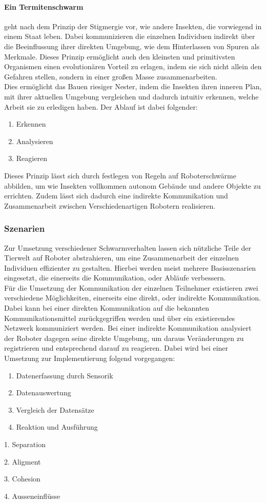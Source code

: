 \paragraph{Ein Termitenschwarm} geht nach dem Prinzip der Stigmergie vor, wie andere Insekten, die vorwiegend in einem Staat leben. Dabei kommunizieren die einzelnen Individuen indirekt über die Beeinflussung ihrer direkten Umgebung, wie dem Hinterlassen von Spuren als Merkmale. Dieses Prinzip ermöglicht auch den kleinsten und primitivsten Organismen einen evolutionären Vorteil zu erlagen, indem sie sich nicht allein den Gefahren stellen, sondern in einer großen Masse zusammenarbeiten.\\
Dies ermöglicht das Bauen riesiger Nester, indem die Insekten ihren inneren Plan, mit ihrer aktuellen Umgebung vergleichen und dadurch intuitiv erkennen, welche Arbeit sie zu erledigen haben.%
	Der Ablauf ist dabei folgender:
\begin{enumerate}
	\item Erkennen
	\item Analysieren
	\item Reagieren
\end{enumerate}
Dieses Prinzip lässt sich durch festlegen von Regeln auf Roboterschwärme abbilden, um wie Insekten vollkommen autonom Gebäude und andere Objekte zu errichten. Zudem lässt sich dadurch eine indirekte Kommunikation und Zusammenarbeit zwischen Verschiedenartigen Robotern realisieren.%

\subsubsection{Szenarien}

Zur Umsetzung verschiedener Schwarmverhalten lassen sich nützliche Teile der Tierwelt auf Roboter abstrahieren, um eine Zusammenarbeit der einzelnen Individuen effizienter zu gestalten. Hierbei werden meist mehrere Basisszenarien eingesetzt, die einerseits die Kommunikation, oder Abläufe verbessern.\\
Für die Umsetzung der Kommunikation der einzelnen Teilnehmer existieren zwei verschiedene Möglichkeiten, einerseits eine direkt, oder indirekte Kommunikation. Dabei kann bei einer direkten Kommunikation auf die bekannten Kommunikationsmittel zurückgegriffen werden und über ein existierendes Netzwerk kommuniziert werden. Bei einer indirekte Kommunikation analysiert der Roboter dagegen seine direkte Umgebung, um daraus Veränderungen zu registrieren und entsprechend darauf zu reagieren. Dabei wird bei einer Umsetzung zur Implementierung folgend vorgegangen:
\begin{enumerate}
	\item Datenerfassung durch Sensorik
	\item Datenauswertung
	\item Vergleich der Datensätze
	\item Reaktion und Ausführung
\end{enumerate}



1. Separation

2. Aligment

3. Cohesion

4. Ausseneinflüsse
